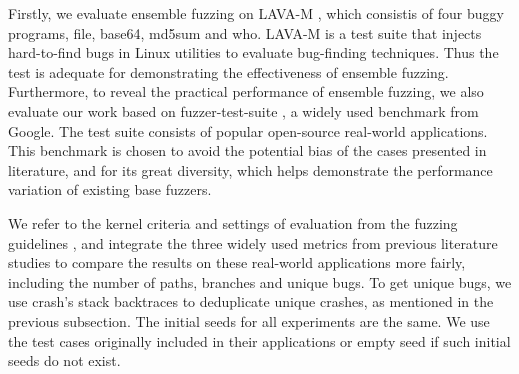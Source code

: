 Firstly, we evaluate ensemble fuzzing on LAVA-M \cite{dolan2016lava}, which consistis of four buggy programs, file, base64, md5sum and who.  LAVA-M is a test suite that injects hard-to-find bugs in Linux utilities to evaluate bug-finding techniques. Thus the test is adequate for demonstrating the effectiveness of ensemble fuzzing.
Furthermore, to reveal the practical performance of ensemble fuzzing, we also evaluate our work based on fuzzer-test-suite \cite{fuzzer_test_suite}, a widely used benchmark from Google. The test suite consists of popular open-source real-world applications.
This benchmark is chosen to avoid the potential bias of the cases presented in literature, and for its great diversity, which helps demonstrate the performance variation of existing base fuzzers. 


We refer to the kernel criteria and settings of evaluation from the fuzzing guidelines \cite{klees2018evaluating}, and integrate the three widely used metrics from previous literature studies to compare the results on these real-world applications more fairly, including the number of paths, branches and unique bugs. 
To get unique bugs, we use crash's stack backtraces to deduplicate unique crashes, as mentioned in the previous subsection. %
The initial seeds for all experiments are the same. We use the test cases originally included in their applications or empty seed if such initial seeds do not exist. %


